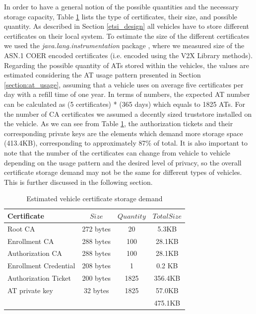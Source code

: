 		In order to have a general notion of the possible quantities and the necessary storage capacity, Table \ref{tab:table3} lists the type of certificates, their size, and possible quantity. As described in Section \ref{etsi_design} all vehicles have to store different certificates on their local system. To estimate the size of the different certificates we used the \textit{java.lang.instrumentation} package \cite{instrumentation}, where we measured size of the ASN.1 COER encoded certificates (i.e. encoded using the V2X Library methods). Regarding the possible quantity of ATs stored within the vehicles, the values are estimated considering the AT usage pattern presented in Section \ref{section:at_usage}, assuming that a vehicle uses on average five certificates per day with a refill time of one year. In terms of numbers, the expected AT number can be calculated as (5 certificates) * (365 days) which equals to 1825 ATs. For the number of CA certificates we assumed a decently sized truststore installed on the vehicle. As we can see from Table \ref{tab:table3}, the authorization tickets and their corresponding private keys are the elements which demand more storage space (413.4KB), corresponding to approximately 87\% of total. It is also important to note that the number of the certificates can change from vehicle to vehicle depending on the usage pattern and the desired level of privacy, so the overall certificate storage demand may not be the same for different types of vehicles. This is further discussed in the following section.
		
		\begin{table}
			\renewcommand{\arraystretch}{1.2} %
			\centering
			\begin{tabular}{lccc}
				\toprule
				Certificate & $Size$ & $Quantity$& $TotalSize$ \\
				\midrule
				Root CA         & 272 bytes & 20 &5.3KB \\
				Enrollment CA  & 288 bytes &100&28.1KB \\
				Authorization CA  & 288 bytes&100&28.1KB\\
				Enrollment Credential  & 208 bytes &1 & 0.2 KB\\
				Authorization Ticket  & 200 bytes &1825 & 356.4KB\\
				AT private key & 32 bytes & 1825 & 57.0KB\\
				\midrule
				\null  & \null & \null & 475.1KB\\
				\bottomrule
			\end{tabular}
			
			\caption{Estimated vehicle certificate storage demand}
			\label{tab:table3}
		\end{table} 
		
